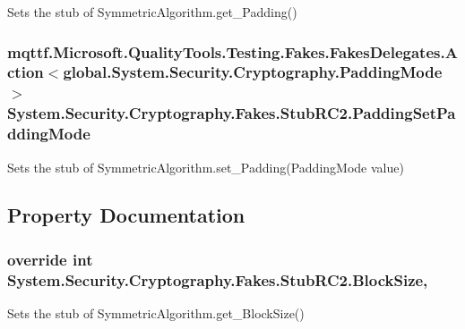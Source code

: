 Sets the stub of Symmetric\-Algorithm.\-get\-\_\-\-Padding()

\hypertarget{class_system_1_1_security_1_1_cryptography_1_1_fakes_1_1_stub_r_c2_a005719d2e29a86d5d82c3891eccb78c9}{
\subsubsection[{Padding\-Set\-Padding\-Mode}]{\setlength{\rightskip}{0pt plus 5cm}mqttf.\-Microsoft.\-Quality\-Tools.\-Testing.\-Fakes.\-Fakes\-Delegates.\-Action$<$global.\-System.\-Security.\-Cryptography.\-Padding\-Mode$>$ System.\-Security.\-Cryptography.\-Fakes.\-Stub\-R\-C2.\-Padding\-Set\-Padding\-Mode}}\label{class_system_1_1_security_1_1_cryptography_1_1_fakes_1_1_stub_r_c2_a005719d2e29a86d5d82c3891eccb78c9}


Sets the stub of Symmetric\-Algorithm.\-set\-\_\-\-Padding(\-Padding\-Mode value)



\subsection{Property Documentation}
\hypertarget{class_system_1_1_security_1_1_cryptography_1_1_fakes_1_1_stub_r_c2_a4fd8ed4d8b70e5cd2741aed9266850e5}{
\subsubsection[{Block\-Size}]{\setlength{\rightskip}{0pt plus 5cm}override int System.\-Security.\-Cryptography.\-Fakes.\-Stub\-R\-C2.\-Block\-Size\hspace{0.3cm}{\ttfamily [get]}, {\ttfamily [set]}}}\label{class_system_1_1_security_1_1_cryptography_1_1_fakes_1_1_stub_r_c2_a4fd8ed4d8b70e5cd2741aed9266850e5}


Sets the stub of Symmetric\-Algorithm.\-get\-\_\-\-Block\-Size()

